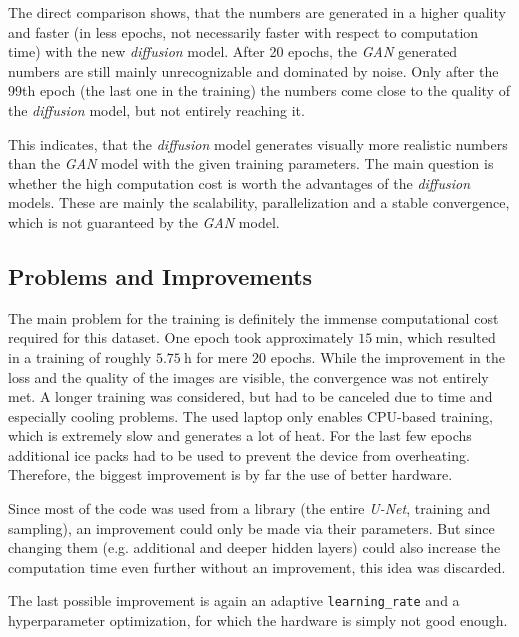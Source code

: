 The direct comparison shows, that the numbers are generated in a higher quality and faster (in less epochs, not necessarily faster with respect to computation time) with the new \textit{diffusion} model.
After 20 epochs, the \textit{GAN} generated numbers are still mainly unrecognizable and dominated by noise. 
Only after the 99th epoch (the last one in the training) the numbers come close to the quality of the \textit{diffusion} model, but not entirely reaching it.

This indicates, that the \textit{diffusion} model generates visually more realistic numbers than the \textit{GAN} model with the given training parameters. The main question is whether the high computation cost is worth the advantages of the \textit{diffusion} models.
These are mainly the scalability, parallelization and a stable convergence, which is not guaranteed by the \textit{GAN} model.

\subsection{Problems and Improvements}
\label{subsec:Problems}
The main problem for the training is definitely the immense computational cost required for this dataset.
One epoch took approximately $\qty{15}{\minute}$, which resulted in a training of roughly $\qty{5.75}{\hour}$ for mere 20 epochs. 
While the improvement in the loss and the quality of the images are visible, the convergence was not entirely met.
A longer training was considered, but had to be canceled due to time and especially cooling problems. The used laptop only enables CPU-based training, which is extremely slow and generates a lot of heat.
For the last few epochs additional ice packs had to be used to prevent the device from overheating.
Therefore, the biggest improvement is by far the use of better hardware. 

Since most of the code was used from a library (the entire \textit{U-Net}, training and sampling), an improvement could only be made via their parameters. 
But since changing them (e.g. additional and deeper hidden layers) could also increase the computation time even further without an improvement, this idea was discarded.

The last possible improvement is again an adaptive \texttt{learning\_rate} and a hyperparameter optimization, for which the hardware is simply not good enough.




